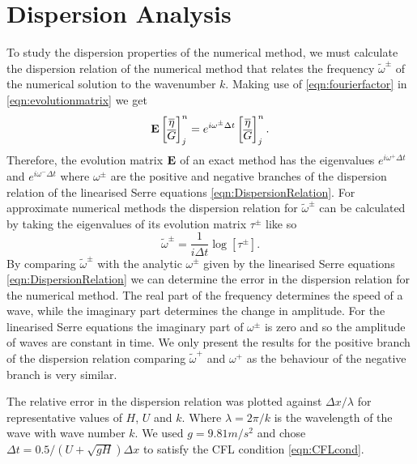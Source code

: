 \section{Dispersion Analysis}
To study the dispersion properties of the numerical method, we must calculate the dispersion relation of the numerical method that relates the frequency $\widetilde{\omega}^\pm$ of the numerical solution to the wavenumber $k$. Making use of \eqref{eqn:fourierfactor} in \eqref{eqn:evolutionmatrix} we get
\begin{equation*}\mathbf{E}\begin{bmatrix}
\overline{\eta} \\ \overline{G}
\end{bmatrix}^{n}_j = 
e^{i \omega^\pm \Delta t}\begin{bmatrix}
\overline{\eta} \\ \overline{G}
\end{bmatrix}^{n}_j.
\label{eqn:dispanalomeganum1}
\end{equation*}
Therefore, the evolution matrix $\mathbf{E}$ of an exact method has the eigenvalues $e^{i \omega^+ \Delta t}$ and $e^{i \omega^- \Delta t}$ where $\omega^\pm$ are the positive and negative branches of the dispersion relation of the linearised Serre equations \eqref{eqn:DispersionRelation}. For approximate numerical methods the dispersion relation for $\widetilde{\omega}^\pm$ can be calculated by taking the eigenvalues of its evolution matrix $\tau^\pm$ like so
\begin{equation*}
\widetilde{\omega}^\pm = \frac{1}{i \Delta t} \log\left[ \tau^\pm\right].
\end{equation*}
By comparing $\widetilde{\omega}^\pm$ with the analytic $\omega^\pm$ given by the linearised Serre equations \eqref{eqn:DispersionRelation} we can determine the error in the dispersion relation for the numerical method. The real part of the frequency determines the speed of a wave, while the imaginary part determines the change in amplitude. For the linearised Serre equations the imaginary part of $\omega^\pm$ is zero and so the amplitude of waves are constant in time. We only present the results for the positive branch of the dispersion relation comparing $\widetilde{\omega}^+$ and $\omega^+$ as the behaviour of the negative branch is very similar. 

The relative error in the dispersion relation was plotted against $\Delta x / \lambda$ for representative values of $H$, $U$ and $k$. Where $\lambda = 2 \pi / k$ is the wavelength of the wave with wave number $k$. We used $g = 9.81m/s^2$ and chose $\Delta t = 0.5 / \left(U + \sqrt{gH}\right) \Delta x$ to satisfy the CFL condition \eqref{eqn:CFLcond}.

